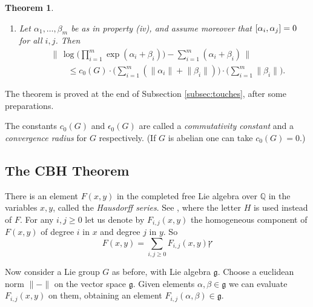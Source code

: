 \documentclass[10pt, a4paper]{amsart}
\newtheorem{thm}[equation]{Theorem}
\theoremstyle{definition}
\numberwithin{equation}{section}
\newcommand{\opn}{\operatorname}
\newcommand{\rmitem}[1]{\item[\text{\textup{(#1)}}]}
\newcommand{\mfrak}[1]{\mathfrak{#1}}
\newcommand{\mbb}[1]{\mathbb{#1}}
\newcommand{\tup}[1]{\textup{#1}}
\newcommand{\norm}[1]{\lVert #1 \rVert}
\newcommand{\Norm}[1]{\bigl\lVert\, #1 \, \bigr\rVert}
\newcommand{\g}{\mfrak{g}}
\newcommand{\lb}{\linebreak}
\begin{document}
\begin{thm}
\begin{enumerate}
\[\begin{aligned}
& \qquad %
\leq c_0(G) \cdot \bigl( \sum\nolimits_{i=1}^m (\norm{\alpha_i}  +
\norm{\beta_i}) \bigr) \cdot 
\bigl( \sum\nolimits_{i=1}^m \norm{\beta_i} \bigr) .
\end{aligned} \]
and
\[ \begin{aligned}
& \Norm{ \opn{log} 
\bigl( \prod\nolimits_{i=1}^m \opn{exp}(\alpha_i + \beta_i) \bigr) -
\opn{log} 
\bigl( \prod\nolimits_{i=1}^m \opn{exp}(\alpha_i) \bigr) } \\
& \qquad 
\leq c_0(G) \cdot 
\bigl( \sum\nolimits_{i=1}^m \norm{\beta_i} \bigr) \, .
\end{aligned} \]
%
\rmitem{v} Let $\alpha_1, \ldots, \beta_m$ be as in property \tup{(iv)},
and assume moreover that $[\alpha_i, \alpha_j] \lb = 0$ for all $i, j$. 
Then
\[ \begin{aligned}
& \Norm{ \opn{log} 
\bigl( \prod\nolimits_{i=1}^m \opn{exp}(\alpha_i + \beta_i) \bigr) -
\sum\nolimits_{i=1}^m (\alpha_i + \beta_i) } \\
& \qquad %
\leq c_0(G) \cdot \bigl( \sum\nolimits_{i=1}^m (\norm{\alpha_i}  +
\norm{\beta_i}) \bigr) \cdot 
\bigl( \sum\nolimits_{i=1}^m \norm{\beta_i} \bigr) .
\end{aligned} \]
\end{enumerate}
\end{thm}

The theorem is proved at the end of Subsection \ref{subsec:touches}, after
some preparations. 

The constants $c_0(G)$ and $\epsilon_0(G)$ are called a {\em commutativity
constant} and a {\em convergence radius} for $G$ respectively. (If $G$ is
abelian one can take $c_0(G) = 0$.)

\subsection{The CBH Theorem}
\label{subsec:CBH}
There is an element $F(x, y)$ in the completed free Lie algebra over 
$\mbb{Q}$ in the variables $x, y$, called the {\em Hausdorff series}.  See
\cite[Sections II.6 and II.7]{Bo}, where the letter $H$ is used instead of $F$. 
For any $i,j \geq 0$ let us denote by $F_{i, j}(x, y)$ the homogeneous
component of $F(x, y)$ of degree $i$ in $x$ and degree $j$ in $y$. So 
\[ F(x, y) =  \sum_{i, j \geq 0} F_{i, j}(x, y) ץ \]

Now consider a Lie group $G$ as before, with Lie algebra $\g$. Choose a
euclidean norm $\norm{-}$ on the vector space $\g$. 
Given elements $\alpha, \beta \in \g$ we can evaluate
$F_{i, j}(x, y)$ on them, obtaining an element
$F_{i, j}(\alpha, \beta) \in \g$. 
\end{document}
